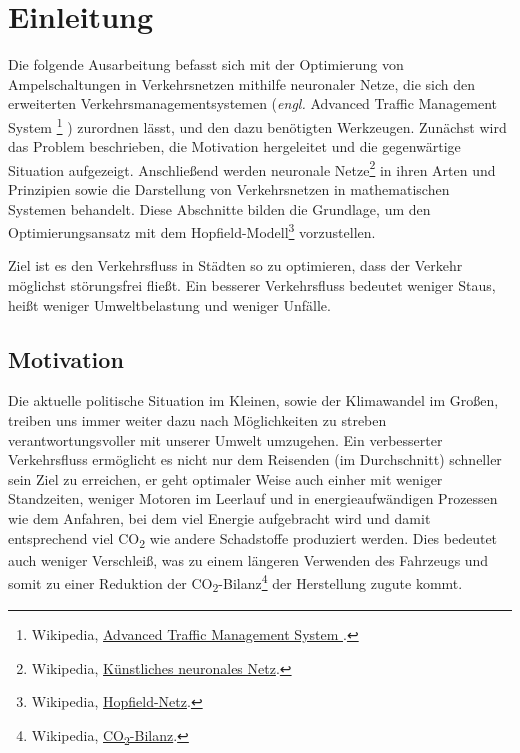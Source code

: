 \section{Einleitung}

Die folgende Ausarbeitung befasst sich mit der Optimierung von Ampelschaltungen in Verkehrsnetzen mithilfe neuronaler Netze, die sich den erweiterten Verkehrsmanagementsystemen (\textit{engl.} Advanced Traffic Management System
\footnote{
Wikipedia, \href{
https://en.wikipedia.org/wiki/Advanced\_Traffic\_Management\_System
}{
Advanced Traffic Management System
}.
}
)
zurordnen lässt, und den dazu benötigten Werkzeugen. Zunächst wird das Problem beschrieben, die Motivation hergeleitet und die gegenwärtige Situation aufgezeigt. Anschließend werden neuronale Netze\footnote{Wikipedia, \href{https://de.wikipedia.org/wiki/K\%C3\%BCnstliches\_neuronales\_Netz}{Künstliches neuronales Netz}.} in ihren Arten und Prinzipien sowie die Darstellung von Verkehrsnetzen in mathematischen Systemen behandelt. Diese Abschnitte bilden die Grundlage, um den Optimierungsansatz mit dem Hopfield-Modell\footnote{Wikipedia, \href{https://de.wikipedia.org/wiki/Hopfield-Netz}{Hopfield-Netz}.} vorzustellen.

Ziel ist es den Verkehrsfluss in Städten so zu optimieren, dass der Verkehr möglichst störungsfrei fließt. Ein besserer Verkehrsfluss bedeutet weniger Staus, heißt weniger Umweltbelastung und weniger Unfälle.

\subsection{Motivation}

Die aktuelle politische Situation im Kleinen, sowie der Klimawandel im Großen, treiben uns immer weiter dazu nach Möglichkeiten zu streben verantwortungsvoller mit unserer Umwelt umzugehen. Ein verbesserter Verkehrsfluss ermöglicht es nicht nur dem Reisenden (im Durchschnitt) schneller sein Ziel zu erreichen, er geht optimaler Weise auch einher mit weniger Standzeiten, weniger Motoren im Leerlauf und in energieaufwändigen Prozessen wie dem Anfahren, bei dem viel Energie aufgebracht wird und damit entsprechend viel CO\textsubscript{2} wie andere Schadstoffe produziert werden. Dies bedeutet auch weniger Verschleiß, was zu einem längeren Verwenden des Fahrzeugs und somit zu einer Reduktion der CO\textsubscript{2}-Bilanz\footnote{Wikipedia, \href{https://de.wikipedia.org/wiki/CO2-Bilanz}{CO\textsubscript{2}-Bilanz}.} der Herstellung zugute kommt.

